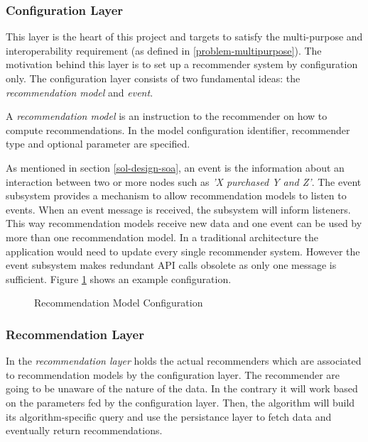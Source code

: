 \subsubsection{Configuration Layer}
\label{sol-design-layer-config}

This layer is the heart of this project and targets to satisfy the multi-purpose and interoperability requirement (as defined in \ref{problem-multipurpose}). The motivation behind this layer is to set up a recommender system by configuration only. The configuration layer consists of two fundamental ideas: the \emph{recommendation model} and \emph{event}.

A \emph{recommendation model} is an instruction to the recommender on how to compute recommendations. In the model configuration identifier, recommender type and optional parameter are specified.

As mentioned in section \ref{sol-design-soa}, an event is the information about an interaction between two or more nodes such as \emph{'X purchased Y and Z'}. The event subsystem provides a mechanism to allow recommendation models to listen to events. When an event message is received, the subsystem will inform listeners. This way recommendation models receive new data and one event can be used by more than one recommendation model. In a traditional architecture the application would need to update every single recommender system. However the event subsystem makes redundant API calls obsolete as only one message is sufficient. Figure \ref{lst:recomodel-config} shows an example configuration.

\begin{figure}[ht]
    \caption{Recommendation Model Configuration}
    \label{lst:recomodel-config}
\end{figure}

\subsubsection{Recommendation Layer}
\label{sol-design-layer-reco}

In the \emph{recommendation layer} holds the actual recommenders which are associated to recommendation models by the configuration layer. The recommender are going to be unaware of the nature of the data. In the contrary it will work based on the parameters fed by the configuration layer. Then, the algorithm will build its algorithm-specific query and use the persistance layer to fetch data and eventually return recommendations.

